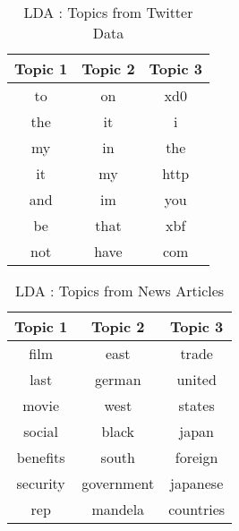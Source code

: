 \begin{table}
	\centering
    \begin{tabular}{|c|c|c|}
    \hline

    \multicolumn{1}{|c|}{\textbf{Topic 1}} & \multicolumn{1}{|c|}{\textbf{Topic 2}} & \multicolumn{1}{|c|}{\textbf{Topic 3}} \\
    \hline
    to  & on   & xd0  \\ 
    the & it   & i    \\ 
     my & in   & the  \\ 
     it & my   & http \\
    and & im   & you  \\ 
     be & that & xbf  \\ 
    not & have & com  \\ 
    \hline
    \end{tabular}
    \caption {LDA : Topics from Twitter Data }
    \label{table1}
\end{table}

\begin{table}
	\centering
    \begin{tabular}{|c|c|c|}
    \hline
    \multicolumn{1}{|c|}{\textbf{Topic 1}} & \multicolumn{1}{|c|}{\textbf{Topic 2}} & \multicolumn{1}{|c|}{\textbf{Topic 3}} \\
    \hline
 film	& east	& trade \\ 
 last	& german	& united \\ 
 movie	& west	& states \\ 
 social	& black	& japan \\ 
 benefits	& south	& foreign \\ 
 security	& government	& japanese \\ 
 rep	& mandela	& countries \\ 
 	\hline
     \end{tabular}
     \caption {LDA : Topics from News Articles }
     \label{table2}
\end{table}